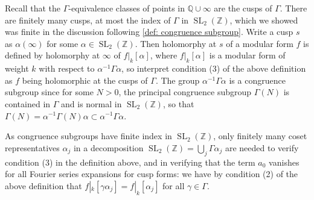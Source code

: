 \documentclass[10pt,leqno,twoside]{article}
\theoremstyle{plain}
\theoremstyle{definition}
\numberwithin{equation}{section}
\numberwithin{lem}{section}
\DeclareMathOperator{\SL}{SL}
\newcommand{\slz}{\SL_2(\mathbb{Z})}
\begin{document}
Recall that the $\varGamma$-equivalence classes of points in $\mathbb Q\cup \infty$ are the cusps of $\varGamma$. There are finitely many cusps, at most the index of $\varGamma$ in $\slz$, which we showed was finite in the discussion following \cref{def: congruence subgroup}. Write a cusp $s$ as $\alpha(\infty)$ for some $\alpha\in\slz$. Then holomorphy at $s$ of a modular form $f$ is defined by holomorphy at $\infty$ of $f|_k[\alpha]$, where $f|_k[\alpha]$ is a modular form of weight $k$ with respect to $\alpha^{-1}\varGamma\alpha$, so interpret condition (3) of the above definition as $f$ being holomorphic at the cusps of $\varGamma$. The group $\alpha^{-1}\varGamma\alpha$ is a congruence subgroup since for some $N>0$, the principal congruence subgroup $\varGamma(N)$ is contained in $\varGamma$ and is normal in $\slz$, so that $\varGamma(N) = \alpha^{-1}\varGamma(N)\alpha\subset \alpha^{-1}\varGamma\alpha$. 

As congruence subgroups have finite index in $\slz$, only finitely many coset representatives $\alpha_j$ in a decomposition $\slz= \bigcup_{j}\varGamma\alpha_j$ are needed to verify condition (3) in the definition above, and in verifying that the term $a_0$ vanishes for all Fourier series expansions for cusp forms: we have by condition (2) of the above definition that $f|_k[\gamma\alpha_j] = f|_k[\alpha_j]$ for all $\gamma\in\varGamma$.
\end{document}
